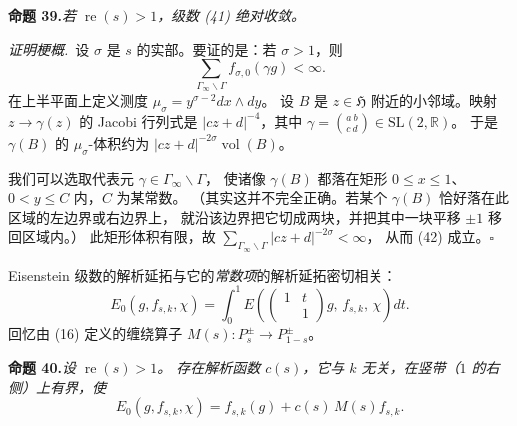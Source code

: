 \par\medskip\noindent\textbf{命题 39.}\quad\emph{若 $\operatorname{re}(s)>1$，级数 (41)
绝对收敛。}

\smallskip
\noindent\emph{证明梗概.}\ 设 $\sigma$ 是 $s$ 的实部。要证的是：若 $\sigma>1$，则
\begin{equation}\tag{42}
\sum_{\Gamma_{\infty}\backslash\Gamma}f_{\sigma,0}(\gamma g)<\infty .
\end{equation}
在上半平面上定义测度 $\mu_{\sigma}=y^{\sigma-2}dx\wedge dy$。
设 $B$ 是 $z\in\mathfrak{H}$ 附近的小邻域。映射 $z\to\gamma(z)$ 的 Jacobi 行列式是
$|cz+d|^{-4}$，其中 $\gamma=\binom{a\ b}{c\ d}\in\mathrm{SL}(2,\mathbb{R})$。
于是 $\gamma(B)$ 的 $\mu_{\sigma}$-体积约为 $|cz+d|^{-2\sigma}\operatorname{vol}(B)$。

我们可以选取代表元 $\gamma\in\Gamma_{\infty}\backslash\Gamma$，
使诸像 $\gamma(B)$ 都落在矩形 $0\le x\le1$、$0<y\le C$ 内，$C$ 为某常数。
（其实这并不完全正确。若某个 $\gamma(B)$ 恰好落在此区域的左边界或右边界上，
就沿该边界把它切成两块，并把其中一块平移 $\pm1$ 移回区域内。）
此矩形体积有限，故 $\sum_{\Gamma_{\infty}\backslash\Gamma}|cz+d|^{-2\sigma}<\infty$，
从而 (42) 成立。\hfill$\square$

Eisenstein 级数的解析延拓与它的\emph{常数项}的解析延拓密切相关：
\begin{equation}\tag{43}
E_{0}(g,f_{s,k},\chi)=\int_{0}^{1}
E\left(\begin{pmatrix}1&t\\&1\end{pmatrix}g,\,f_{s,k},\,\chi\right)dt .
\end{equation}
回忆由 (16) 定义的缠绕算子 $M(s):P_{s}^{\pm}\to P_{1-s}^{\pm}$。

\par\medskip\noindent\textbf{命题 40.}\quad\emph{设 $\operatorname{re}(s)>1$。
存在解析函数 $c(s)$，它与 $k$ 无关，在竖带（$1$ 的右侧）上有界，使}
\begin{equation}\tag{44}
E_{0}(g,f_{s,k},\chi)=f_{s,k}(g)+c(s)\,M(s)f_{s,k}.
\end{equation}

